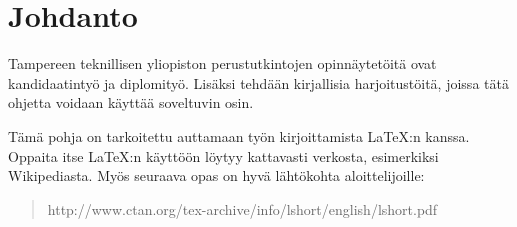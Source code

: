 \chapter{Johdanto}

Tampereen teknillisen yliopiston perustutkintojen opinnäytetöitä ovat
kandidaatintyö ja diplomityö. Lisäksi tehdään kirjallisia
harjoitustöitä, joissa tätä ohjetta voidaan käyttää soveltuvin osin.

Tämä pohja on tarkoitettu auttamaan työn kirjoittamista \LaTeX:n
kanssa. Oppaita itse \LaTeX:n käyttöön löytyy kattavasti verkosta,
esimerkiksi Wikipediasta. Myös seuraava opas on hyvä lähtökohta
aloittelijoille:
\begin{quote}
http://www.ctan.org/tex-archive/info/lshort/english/lshort.pdf
\end{quote}